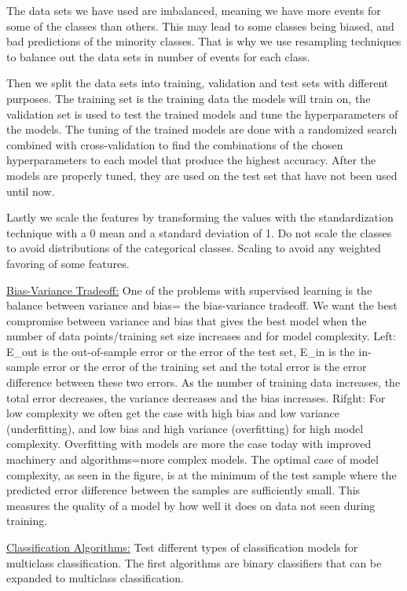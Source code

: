 \documentclass[a4paper, american, 12pt]{report}
\begin{document}
	The data sets we have used are imbalanced, meaning we have more events for some of the classes than others. This may lead to some classes being biased, and bad predictions of the minority classes. That is why we use resampling techniques to balance out the data sets in number of events for each class.
	
	Then we split the data sets into training, validation and test sets with different purposes. The training set is the training data the models will train on, the validation set is used to test the trained models and tune the hyperparameters of the models. The tuning of the trained models are done with a randomized search combined with cross-validation to find the combinations of the chosen hyperparameters to each model that produce the highest accuracy.
	After the models are properly tuned, they are used on the test set that have not been used until now.
	
	Lastly we scale the features by transforming the values with the standardization technique with a 0 mean and a standard deviation of 1. Do not scale the classes to avoid distributions of the categorical classes. Scaling to avoid any weighted favoring of some features.
	
	
	\underline{Bias-Variance Tradeoff:}
	One of the problems with supervised learning is the balance between variance and bias= the bias-variance tradeoff. We want the best compromise between variance and bias that gives the best model when the number of data points/training set size increases and for model complexity.
	Left: E\_out is the out-of-sample error or the error of the test set, E\_in is the in-sample error or the error of the training set and the total error is the error difference between these two errors. As the number of training data increases, the total error decreases, the variance decreases and the bias increases. 
	Rifght: For low complexity we often get the case with high bias and low variance (underfitting), and low bias and high variance (overfitting) for high model complexity. Overfitting with models are more the case today with improved machinery and algorithms=more complex models. The optimal case of model complexity, as seen in the figure, is at the minimum of the test sample where the predicted error difference between the samples are sufficiently small. This measures the quality of a model by how well it does on data not seen during training. 
	
	
	\underline{Classification Algorithms:}
	Test different types of classification models for multiclass classification. The first algorithms are binary classifiers that can be expanded to multiclass classification.
	
\end{document}
